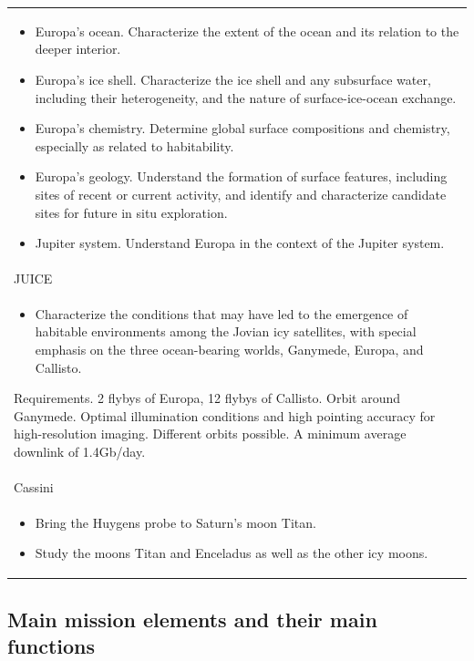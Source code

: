 \begin{longtable}{p{}}
  \begin{itemize}
  \item Europa's ocean. Characterize the extent of the ocean and its
    relation to the deeper interior.
  \item Europa's ice shell. Characterize the ice shell and any
    subsurface water, including their heterogeneity, and the nature of
    surface-ice-ocean exchange.
  \item Europa's chemistry. Determine global surface compositions and
    chemistry, especially as related to habitability.
  \item Europa's geology. Understand the formation of surface
    features, including sites of recent or current activity, and
    identify and characterize candidate sites for future in situ
    exploration.
  \item Jupiter system. Understand Europa in the context of the
    Jupiter system.
  \end{itemize} \\

  JUICE \\* \midrule

  \begin{itemize}
  \item Characterize the conditions that may have led to the emergence
    of habitable environments among the Jovian icy satellites, with
    special emphasis on the three ocean-bearing worlds, Ganymede,
    Europa, and Callisto.
  \end{itemize}

  Requirements. 2 flybys of Europa, 12 flybys of Callisto. Orbit
  around Ganymede. Optimal illumination conditions and high pointing
  accuracy for high-resolution imaging. Different orbits possible. A
  minimum average downlink of 1.4Gb/day. \\ \pagebreak

  Cassini \\* \midrule

  \begin{itemize}
  \item Bring the Huygens probe to Saturn's moon Titan.
  \item Study the moons Titan and Enceladus as well as the other icy
    moons.
  \end{itemize} \\
\end{longtable}

\subsection{Main mission elements and their main functions}

